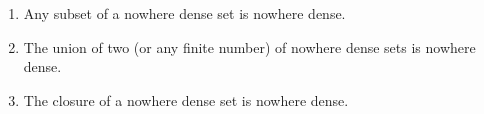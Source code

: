 \begin{enumerate}
  \item Any subset of a nowhere dense set is nowhere dense.
  \item The union of two (or any finite number) of nowhere dense sets is nowhere dense.
  \item The closure of a nowhere dense set is nowhere dense.
\end{enumerate}
